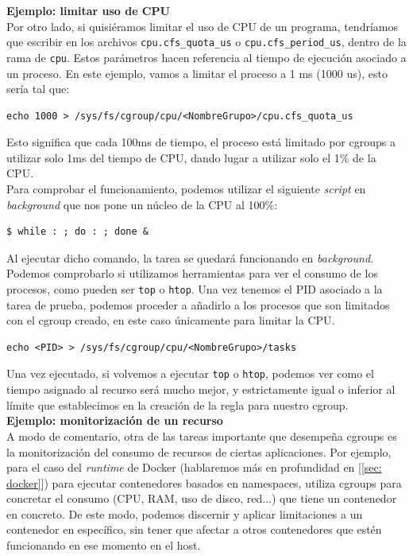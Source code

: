 \documentclass[12pt]{article}
\begin{document}
	\vspace{10px}
	\noindent \textbf{\large Ejemplo: limitar uso de CPU}\\
	
	\noindent Por otro lado, si quisiéramos limitar el uso de CPU de un programa, tendríamos que escribir en los archivos \texttt{cpu.cfs\_quota\_us} o \texttt{cpu.cfs\_period\_us}, dentro de la rama de \texttt{cpu}. Estos parámetros hacen referencia al tiempo de ejecución asociado a un proceso. En este ejemplo, vamos a limitar el proceso a 1 ms (1000 us), esto sería tal que:
	
	\begin{verbatim}
echo 1000 > /sys/fs/cgroup/cpu/<NombreGrupo>/cpu.cfs_quota_us
	\end{verbatim}

	\noindent Esto significa que cada 100ms de tiempo, el proceso está limitado por cgroups a utilizar solo 1ms del tiempo de CPU, dando lugar a utilizar solo el 1\% de la CPU. \\

	\noindent Para comprobar el funcionamiento, podemos utilizar el siguiente \textit{script} en \textit{background} que nos pone un núcleo de la CPU al 100\%:
	\begin{verbatim}
$ while : ; do : ; done &
	\end{verbatim}

	\noindent Al ejecutar dicho comando, la tarea se quedará funcionando en \textit{background}. Podemos comprobarlo si utilizamos herramientas para ver el consumo de los procesos, como pueden ser \texttt{top} o \texttt{htop}. Una vez tenemos el PID asociado a la tarea de prueba, podemos proceder a añadirlo a los procesos que son limitados con el cgroup creado, en este caso únicamente para limitar la CPU.
	\begin{verbatim}
echo <PID> > /sys/fs/cgroup/cpu/<NombreGrupo>/tasks
	\end{verbatim}

	\noindent Una vez ejecutado, si volvemos a ejecutar \texttt{top} o \texttt{htop}, podemos ver como el tiempo asignado al recurso será mucho mejor, y estrictamente igual o inferior al límite que establecimos en la creación de la regla para nuestro cgroup.	\\
	
	\vspace{10px}
	\noindent \textbf{\large Ejemplo: monitorización de un recurso}\\
	
	\noindent A modo de comentario, otra de las tareas importante que desempeña cgroups es la monitorización del consumo de recursos de ciertas aplicaciones. Por ejemplo, para el caso del \textit{runtime} de Docker (hablaremos más en profundidad en [\ref{sec: docker}]) para ejecutar contenedores basados en namespaces, utiliza cgroups para concretar el consumo (CPU, RAM, uso de disco, red...) que tiene un contenedor en concreto. De este modo, podemos discernir y aplicar limitaciones a un contenedor en específico, sin tener que afectar a otros contenedores que estén funcionando en ese momento en el host. \\
	
\end{document}
